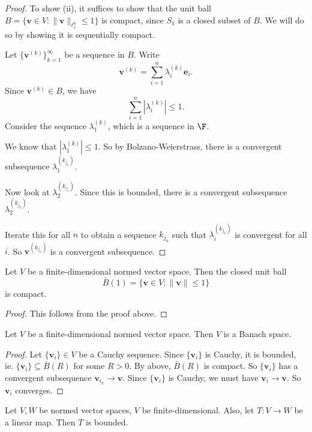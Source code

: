 \documentclass[a4paper]{article}
\begin{document}
\begin{proof}
  To show (ii), it suffices to show that the unit ball $B = \{\mathbf{v} \in V: \|\mathbf{v}\|_{\ell_1^n}\leq 1\}$ is compact, since $S_1$ is a closed subset of $B$. We will do so by showing it is sequentially compact.

  Let $\{\mathbf{v}^{(k)}\}_{k = 1}^\infty$ be a sequence in $B$. Write
  \[
    \mathbf{v}^{(k)} = \sum_{i = 1}^n \lambda_i^{(k)} \mathbf{e}_i.
  \]
  Since $\mathbf{v}^{(k)} \in B$, we have
  \[
    \sum_{i = 1}^n |\lambda_i^{(k)}| \leq 1.
  \]
  Consider the sequence $\lambda_1^{(k)}$, which is a sequence in $\F$.

  We know that $|\lambda_1^{(k)}| \leq 1$. So by Bolzano-Weierstrass, there is a convergent subsequence $\lambda_1^{(k_{j_1})}$.

  Now look at $\lambda_2^{(k_{j_1})}$. Since this is bounded, there is a convergent subsequence $\lambda_2^{(k_{j_2})}$.

  Iterate this for all $n$ to obtain a sequence $k_{j_n}$ such that $\lambda_i^{(k_{j_n})}$ is convergent for all $i$. So $\mathbf{v}^{(k_{j_n})}$ is a convergent subsequence.
\end{proof}

\begin{prop}
  Let $V$ be a finite-dimensional normed vector space. Then the closed unit ball
  \[
    \bar{B}(1) = \{\mathbf{v} \in V: \|\mathbf{v}\| \leq 1\}
  \]
  is compact.
\end{prop}

\begin{proof}
  This follows from the proof above.
\end{proof}

\begin{prop}
  Let $V$ be a finite-dimensional normed vector space. Then $V$ is a Banach space.
\end{prop}

\begin{proof}
  Let $\{\mathbf{v}_i\} \in V$ be a Cauchy sequence. Since $\{\mathbf{v}_i\}$ is Cauchy, it is bounded, ie. $\{\mathbf{v}_i\} \subseteq \bar{B}(R)$ for some $R > 0$. By above, $\bar{B}(R)$ is compact. So $\{\mathbf{v}_i\}$ has a convergent subsequence $\mathbf{v}_{i_k} \to \mathbf{v}$. Since $\{\mathbf{v}_i\}$ is Cauchy, we must have $\mathbf{v}_i \to \mathbf{v}$. So $\mathbf{v}_i$ converges.
\end{proof}

\begin{prop}
  Let $V, W$ be normed vector spaces, $V$ be finite-dimensional. Also, let $T: V\to W$ be a linear map. Then $T$ is bounded.
\end{prop}
\end{document}
